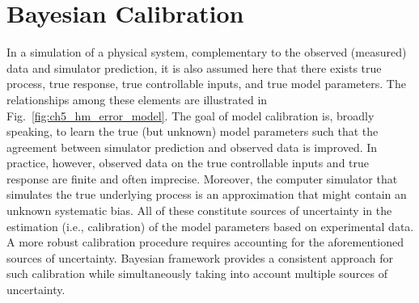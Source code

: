 \section{Bayesian Calibration}\label{sec:bc_modular_bayes}

In a simulation of a physical system, complementary to the observed (measured) data and simulator prediction, it is also assumed here that there exists true process, true response, true controllable inputs, and true model parameters. 
The relationships among these elements are illustrated in Fig.~\ref{fig:ch5_hm_error_model}.
The goal of model calibration is, broadly speaking, to learn the true (but unknown) model parameters such that the agreement between simulator prediction and observed data is improved.
In practice, however, observed data on the true controllable inputs and true response are finite and often imprecise.
Moreover, the computer simulator that simulates the true underlying process is an approximation that might contain an unknown systematic bias.
All of these constitute sources of uncertainty in the estimation (i.e., calibration) of the model parameters based on experimental data.
A more robust calibration procedure requires accounting for the aforementioned sources of uncertainty.
Bayesian framework provides a consistent approach for such calibration while simultaneously taking into account multiple sources of uncertainty.
